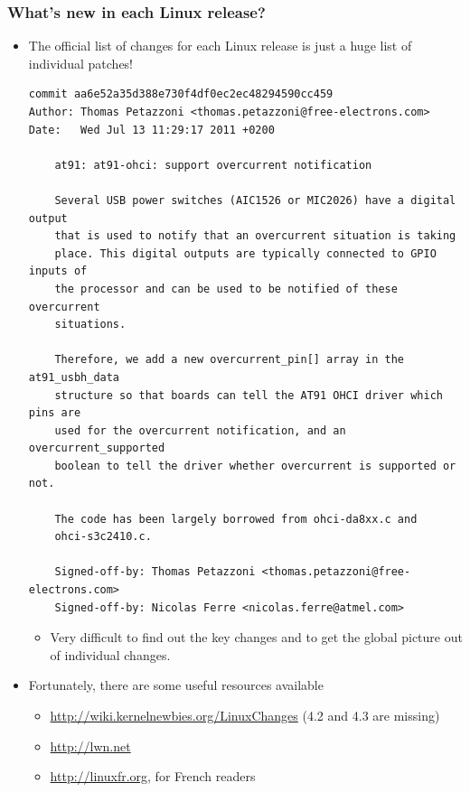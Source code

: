 \begin{frame}[fragile]
  \frametitle{What's new in each Linux release?}
  \begin{itemize}
  \item The official list of changes for each Linux release is just a
    huge list of individual patches!
\Tiny
    \begin{verbatim}
commit aa6e52a35d388e730f4df0ec2ec48294590cc459
Author: Thomas Petazzoni <thomas.petazzoni@free-electrons.com>
Date:   Wed Jul 13 11:29:17 2011 +0200

    at91: at91-ohci: support overcurrent notification

    Several USB power switches (AIC1526 or MIC2026) have a digital output
    that is used to notify that an overcurrent situation is taking
    place. This digital outputs are typically connected to GPIO inputs of
    the processor and can be used to be notified of these overcurrent
    situations.

    Therefore, we add a new overcurrent_pin[] array in the at91_usbh_data
    structure so that boards can tell the AT91 OHCI driver which pins are
    used for the overcurrent notification, and an overcurrent_supported
    boolean to tell the driver whether overcurrent is supported or not.

    The code has been largely borrowed from ohci-da8xx.c and
    ohci-s3c2410.c.

    Signed-off-by: Thomas Petazzoni <thomas.petazzoni@free-electrons.com>
    Signed-off-by: Nicolas Ferre <nicolas.ferre@atmel.com>
\end{verbatim}
\normalsize
    \begin{itemize}
    \item Very difficult to find out the key changes and to get the
      global picture out of individual changes.
    \end{itemize}
  \item Fortunately, there are some useful resources available
    \begin{itemize}
    \item \url{http://wiki.kernelnewbies.org/LinuxChanges}
	(4.2 and 4.3 are missing)
    \item \url{http://lwn.net}
    \item \url{http://linuxfr.org}, for French readers
    \end{itemize}
  \end{itemize}
\end{frame}
